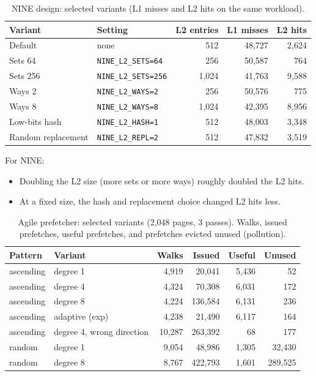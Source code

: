 \begin{table}[htbp]
\centering
\small
\caption{NINE design: selected variants (L1 misses and L2 hits on the same workload).}
\label{tab:sweep_nine}
\begin{tabular}{l l r r r}
\toprule
\textbf{Variant} & \textbf{Setting} & \textbf{L2 entries} & \textbf{L1 misses} & \textbf{L2 hits} \\
\midrule
Default & none & 512 & 48,727 & 2,624 \\
Sets 64 & \texttt{NINE\_L2\_SETS=64} & 256 & 50,587 & 764 \\
Sets 256 & \texttt{NINE\_L2\_SETS=256} & 1,024 & 41,763 & 9,588 \\
Ways 2 & \texttt{NINE\_L2\_WAYS=2} & 256 & 50,576 & 775 \\
Ways 8 & \texttt{NINE\_L2\_WAYS=8} & 1,024 & 42,395 & 8,956 \\
Low-bits hash & \texttt{NINE\_L2\_HASH=1} & 512 & 48,003 & 3,348 \\
Random replacement & \texttt{NINE\_L2\_REPL=2} & 512 & 47,832 & 3,519 \\
\bottomrule
\end{tabular}
\end{table}

\noindent For NINE:
\begin{itemize}
    \item Doubling the L2 size (more sets or more ways) roughly doubled the L2 hits.
    \item At a fixed size, the hash and replacement choice changed L2 hits less.
\end{itemize}

\begin{table}[htbp]
\centering
\small
\caption{Agile prefetcher: selected variants (2,048 pages, 3 passes). Walks, issued prefetches, useful prefetches, and prefetches evicted unused (pollution).}
\label{tab:sweep_agile}
\begin{tabular}{l l r r r r}
\toprule
\textbf{Pattern} & \textbf{Variant} & \textbf{Walks} & \textbf{Issued} & \textbf{Useful} & \textbf{Unused} \\
\midrule
ascending & degree 1 & 4,919 & 20,041 & 5,436 & 52 \\
ascending & degree 4 & 4,324 & 70,308 & 6,031 & 172 \\
ascending & degree 8 & 4,224 & 136,584 & 6,131 & 236 \\
ascending & adaptive (exp) & 4,238 & 21,490 & 6,117 & 164 \\
ascending & degree 4, wrong direction & 10,287 & 263,392 & 68 & 177 \\
random & degree 1 & 9,054 & 48,986 & 1,305 & 32,430 \\
random & degree 8 & 8,767 & 422,793 & 1,601 & 289,525 \\
\bottomrule
\end{tabular}
\end{table}

